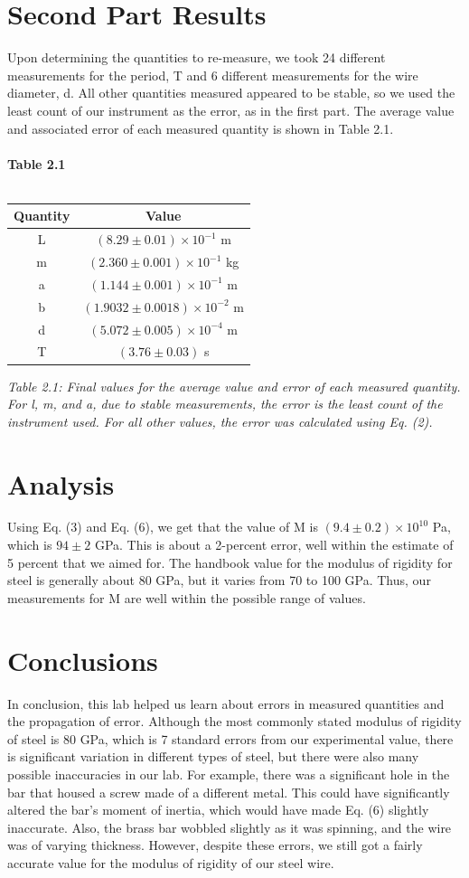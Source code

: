 \documentclass[leqno]{article}
\begin{document}
\section*{Second Part Results}
Upon determining the quantities to re-measure, we took 24 different measurements for the period, T and 6 different measurements for the wire diameter, d.  All other quantities measured appeared to be stable, so we used the least count of our instrument as the error, as in the first part.  The average value  and associated error of each measured quantity is shown in Table 2.1.\\\\
\textbf{Table 2.1}\\\\
\begin{tabular}{c|c}
	Quantity & Value\\
	\hline
	L & $(8.29\pm0.01)\times 10^{-1}$ m\\
	m & $(2.360\pm0.001)\times 10^{-1}$ kg\\
	a & $(1.144\pm0.001)\times 10^{-1}$ m\\
	b & $(1.9032\pm0.0018)\times10^{-2}$ m\\
	d & $(5.072\pm0.005)\times 10^{-4}$ m\\
	T & $(3.76\pm0.03)$ s\\
\end{tabular}
\begin{flushleft}
\textit{\small Table 2.1: Final values for the average value and error of each measured quantity.  For l, m, and a, due to stable measurements, the error is the least count of the instrument used.  For all other values, the error was calculated using Eq. (2).}
\end{flushleft}
\section*{Analysis}
Using Eq. (3) and Eq. (6), we get that the value of M is $(9.4\pm0.2)\times10^{10}$ Pa, which is $94\pm2$ GPa.  This is about a 2-percent error, well within the estimate of 5 percent that we aimed for.  The handbook value for the modulus of rigidity for steel is generally about 80 GPa, but it varies from 70 to 100 GPa.  Thus, our measurements for M are well within the possible range of values.
\section*{Conclusions}
In conclusion, this lab helped us learn about errors in measured quantities and the propagation of error.  Although the most commonly stated modulus of rigidity of steel is 80 GPa, which is 7 standard errors from our experimental value, there is significant variation in different types of steel, but there were also many possible inaccuracies in our lab.  For example, there was a significant hole in the bar that housed a screw made of a different metal.  This could have significantly altered the bar's moment of inertia, which would have made Eq. (6) slightly inaccurate.  Also, the brass bar wobbled slightly as it was spinning, and the wire was of varying thickness.  However, despite these errors, we still got a fairly accurate value for the modulus of rigidity of our steel wire.
\newpage
\end{document}
